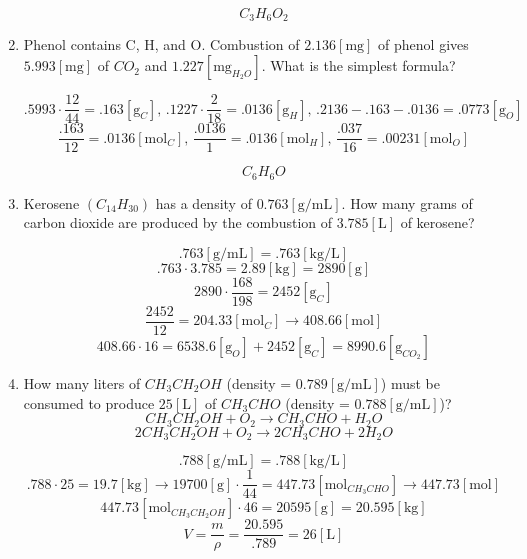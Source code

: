 \documentclass[12pt]{article}
\begin{document}
\begin{enumerate}
    $$C_3H_6O_2$$

  \item Phenol contains C, H, and O. Combustion of $2.136[\si{\milli\gram}]$ of phenol gives $5.993[\si{\milli\gram}]$ of $CO_2$ and $1.227[\si{\milli\gram}_{H_2O}]$. What is the simplest formula?

    $$.5993\cdot\frac{12}{44}=.163[\si{\gram}_C],\,.1227\cdot\frac{2}{18}=.0136[\si{\gram}_H],\,.2136-.163-.0136=.0773[\si{\gram}_O]$$
    $$\frac{.163}{12}=.0136[\si{\mole}_C],\,\frac{.0136}{1}=.0136[\si{\mole}_H],\,\frac{.037}{16}=.00231[\si{\mole}_O]$$

    $$C_6H_6O$$

  \item Kerosene $(C_{14}H_{30})$ has a density of $0.763[\si{\gram\per\milli\liter}]$. How many grams of carbon dioxide are produced by the combustion of $3.785[\si{\liter}]$ of kerosene? 

    $$.763[\si{\gram\per\milli\liter}]=.763[\si{\kilo\gram\per\liter}]$$
    $$.763\cdot3.785=2.89[\si{\kilo\gram}]=2890[\si{\gram}]$$
    $$2890\cdot\frac{168}{198}=2452[\si{\gram}_C]$$
    $$\frac{2452}{12}=204.33[\si{\mole}_C]\rightarrow408.66[\si{\mole}]$$
    $$408.66\cdot16=6538.6[\si{\gram}_O]+2452[\si{\gram}_C]=8990.6[\si{\gram}_{CO_2}]$$
  \item  How many liters of $CH_3CH_2OH$ (density = $0.789[\si{\gram\per\milli\liter}]$) must be consumed to produce $25[\si{\liter}]$ of $CH_3CHO$ (density = $0.788[\si{\gram\per\milli\liter}]$)?
  $$CH_3CH_2OH+O_2\rightarrow CH_3CHO+H_2O$$
  $$2CH_3CH_2OH+O_2\rightarrow 2CH_3CHO+2H_2O$$

  $$.788[\si{\gram\per\milli\liter}]=.788[\si{\kilo\gram\per\liter}]$$
  $$.788\cdot25=19.7[\si{\kilo\gram}]\rightarrow19700[\si{\gram}]\cdot\frac{1}{44}=447.73[\si{\mole}_{CH_3CHO}]\rightarrow447.73[\si{\mole}]$$
  $$447.73[\si{\mole}_{CH_3CH_2OH}]\cdot46=20595[\si{\gram}]=20.595[\si{\kilo\gram}]$$
  $$V=\frac{m}{\rho}=\frac{20.595}{.789}=26[\si{\liter}]$$

\end{enumerate}
\end{document}
